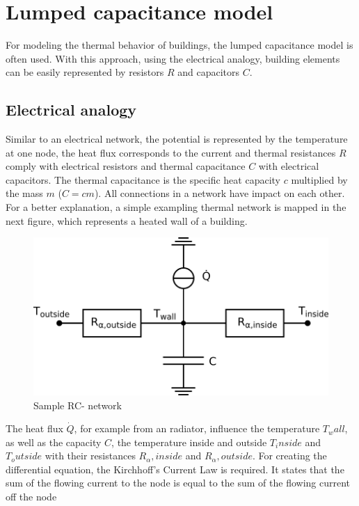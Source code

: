     
\section{Lumped capacitance model}
\label{section:modeling}
For modeling the thermal behavior of buildings, the lumped capacitance model is often used. With this approach, using the electrical analogy, building elements can be easily represented by resistors $R$ and capacitors $C$. \cite{Kramer.2012}

\subsection{Electrical analogy}
\label{electricalanalogy}

    Similar to an electrical network, the potential is represented by the temperature at one node, the heat flux corresponds to the current and thermal resistances $R$ comply with electrical resistors and thermal capacitance $C$ with electrical capacitors. The thermal capacitance is the specific heat capacity $c$ multiplied by the mass $m$ ($C=cm$). All connections in a network have impact on each other. For a better explanation, a simple exampling thermal network is mapped in the next figure, which represents a heated wall of a building.
    \begin{figure}[h]
    \centering
    \includegraphics[scale=0.8]{figure/beispiel Netzwerk.png}
    \caption{Sample RC- network}
    \label{fig:sampleRCnetwork}
    \end{figure}
    The heat flux $\dot{Q}$, for example from an radiator, influence the temperature $T_wall$, as well as the capacity $C$, the temperature inside and outside $T_inside$ and $T_outside$ with their resistances $R_\alpha,inside$ and $R_\alpha,outside$.
    For creating the differential equation, the Kirchhoff's Current Law is required. It states that the sum of the flowing current to the node is equal to the sum of the flowing current off the node 
